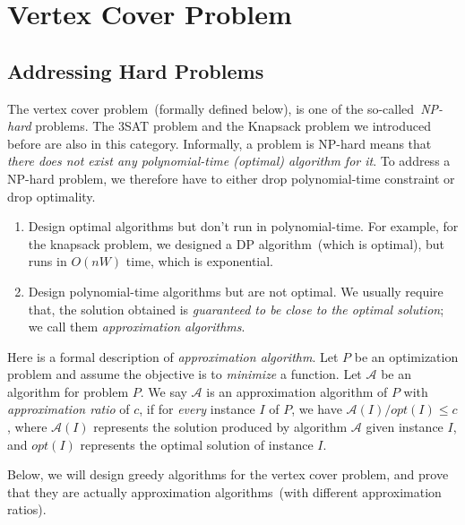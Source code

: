 \setcounter{definition}{0} \setcounter{property}{0} \setcounter{claim}{0} \setcounter{fact}{0} \setcounter{corollary}{0} \setcounter{figure}{0}
\section{Vertex Cover Problem}

\subsection*{Addressing Hard Problems}

The vertex cover problem~(formally defined below), is one of the
so-called~\emph{NP-hard} problems.  The 3SAT problem and the Knapsack problem
we introduced before are also in this category.  Informally, a problem is
{NP-hard} means that \emph{there does not exist any polynomial-time (optimal)
algorithm for it}. To address a NP-hard problem, we therefore have to either
drop polynomial-time constraint or drop optimality.

\begin{enumerate}
\item Design optimal algorithms but don't run in polynomial-time.
For example, for the knapsack problem, we designed a DP algorithm~(which
is optimal), but runs in $O(nW)$ time, which is exponential.
\item Design polynomial-time algorithms but are not optimal.
We usually require that, the solution obtained is \emph{guaranteed
to be close to the optimal solution}; we call them \emph{approximation algorithms}.
\end{enumerate}

Here is a formal description of \emph{approximation algorithm}.
Let $P$ be an optimization problem and assume the objective
is to \emph{minimize} a function.
Let $\mathcal{A}$ be an algorithm for problem $P$. We say $\mathcal{A}$
is an approximation algorithm of $P$ with \emph{approximation ratio} of $c$, if for \emph{every} instance
$I$ of $P$, we have $\mathcal{A}(I) / opt(I) \le c$,
where $\mathcal{A}(I)$ represents the solution produced by algorithm $\mathcal{A}$ given instance $I$,
and $opt(I)$ represents the optimal solution of instance $I$.

Below, we will design greedy algorithms for the vertex cover problem, and
prove that they are actually approximation algorithms~(with different approximation ratios).

